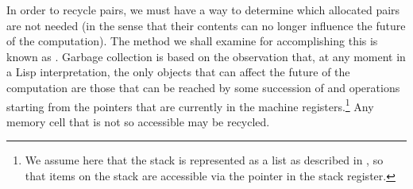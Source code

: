 In order to recycle pairs, we must have a way to determine which allocated
pairs are not needed (in the sense that their contents can no longer influence
the future of the computation).  The method we shall examine for accomplishing
this is known as .  Garbage collection is based on
the observation that, at any moment in a Lisp interpretation, the only objects
that can affect the future of the computation are those that can be reached by
some succession of  and  operations starting from the
pointers that are currently in the machine registers.\footnote{We assume here
that the stack is represented as a list as described in , so
that items on the stack are accessible via the pointer in the stack register.}
Any memory cell that is not so accessible may be recycled.

